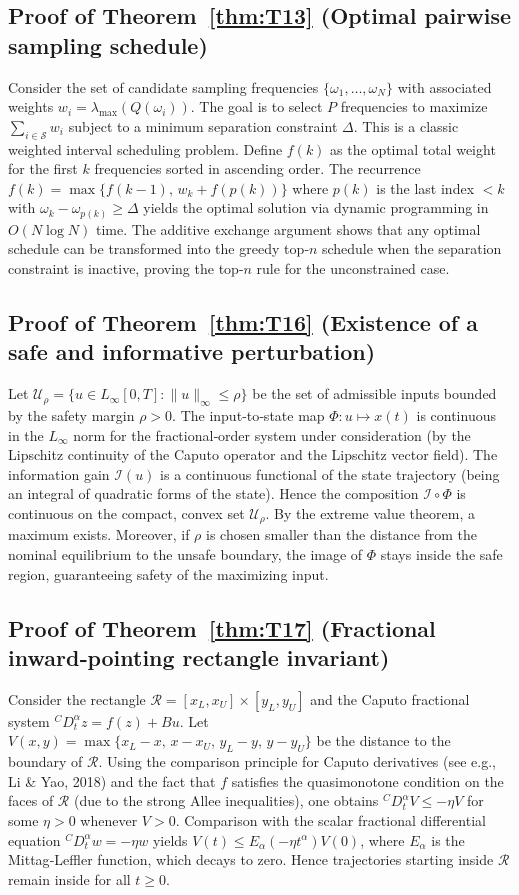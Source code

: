 \subsection{Proof of Theorem~\ref{thm:T13} (Optimal pairwise sampling schedule)}
Consider the set of candidate sampling frequencies $\{\omega_1,\dots,\omega_N\}$ with associated weights $w_i = \lambda_{\max}(Q(\omega_i))$. The goal is to select $P$ frequencies to maximize $\sum_{i\in\mathcal{S}} w_i$ subject to a minimum separation constraint $\Delta$. This is a classic weighted interval scheduling problem. Define $f(k)$ as the optimal total weight for the first $k$ frequencies sorted in ascending order. The recurrence $f(k)=\max\{f(k-1),\, w_k + f(p(k))\}$ where $p(k)$ is the last index $<k$ with $\omega_k-\omega_{p(k)}\ge\Delta$ yields the optimal solution via dynamic programming in $O(N\log N)$ time. The additive exchange argument shows that any optimal schedule can be transformed into the greedy top‑$n$ schedule when the separation constraint is inactive, proving the top‑$n$ rule for the unconstrained case.

\subsection{Proof of Theorem~\ref{thm:T16} (Existence of a safe and informative perturbation)}
Let $\mathcal{U}_\rho = \{u\in L_\infty[0,T] : \|u\|_\infty \le \rho\}$ be the set of admissible inputs bounded by the safety margin $\rho>0$. The input‑to‑state map $\Phi: u\mapsto x(t)$ is continuous in the $L_\infty$ norm for the fractional‑order system under consideration (by the Lipschitz continuity of the Caputo operator and the Lipschitz vector field). The information gain $\mathcal{I}(u)$ is a continuous functional of the state trajectory (being an integral of quadratic forms of the state). Hence the composition $\mathcal{I}\circ\Phi$ is continuous on the compact, convex set $\mathcal{U}_\rho$. By the extreme value theorem, a maximum exists. Moreover, if $\rho$ is chosen smaller than the distance from the nominal equilibrium to the unsafe boundary, the image of $\Phi$ stays inside the safe region, guaranteeing safety of the maximizing input.

\subsection{Proof of Theorem~\ref{thm:T17} (Fractional inward‑pointing rectangle invariant)}
Consider the rectangle $\mathcal{R}=[x_L,x_U]\times[y_L,y_U]$ and the Caputo fractional system ${}^C\!D_t^\alpha z = f(z)+Bu$. Let $V(x,y)=\max\{x_L-x,\,x-x_U,\,y_L-y,\,y-y_U\}$ be the distance to the boundary of $\mathcal{R}$. Using the comparison principle for Caputo derivatives (see e.g., Li \& Yao, 2018) and the fact that $f$ satisfies the quasimonotone condition on the faces of $\mathcal{R}$ (due to the strong Allee inequalities), one obtains ${}^C\!D_t^\alpha V \le -\eta V$ for some $\eta>0$ whenever $V>0$. Comparison with the scalar fractional differential equation ${}^C\!D_t^\alpha w = -\eta w$ yields $V(t)\le E_\alpha(-\eta t^\alpha)V(0)$, where $E_\alpha$ is the Mittag‑Leffler function, which decays to zero. Hence trajectories starting inside $\mathcal{R}$ remain inside for all $t\ge0$.


